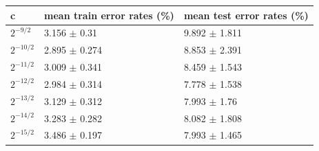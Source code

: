 \begin{tabular}{lll}
\toprule
c & mean train error rates (\%) & mean test error rates (\%) \\
\midrule
$2^{-9/2}$ & 3.156 $\pm$ 0.31 & 9.892 $\pm$ 1.811 \\
$2^{-10/2}$ & 2.895 $\pm$ 0.274 & 8.853 $\pm$ 2.391 \\
$2^{-11/2}$ & 3.009 $\pm$ 0.341 & 8.459 $\pm$ 1.543 \\
$2^{-12/2}$ & 2.984 $\pm$ 0.314 & 7.778 $\pm$ 1.538 \\
$2^{-13/2}$ & 3.129 $\pm$ 0.312 & 7.993 $\pm$ 1.76 \\
$2^{-14/2}$ & 3.283 $\pm$ 0.282 & 8.082 $\pm$ 1.808 \\
$2^{-15/2}$ & 3.486 $\pm$ 0.197 & 7.993 $\pm$ 1.465 \\
\bottomrule
\end{tabular}
